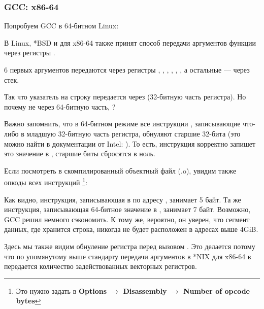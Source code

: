 \subsubsection{GCC: x86-64}

Попробуем GCC в 64-битном Linux:



В Linux, *BSD и \MacOSX для x86-64 также принят способ передачи аргументов функции через регистры \SysVABI.

6 первых аргументов передаются через регистры \RDI, \RSI, \RDX, \RCX, , , а остальные --- через стек.

Так что указатель на строку передается через \EDI (32-битную часть регистра).
Но почему не через 64-битную часть, \RDI?

Важно запомнить, что в 64-битном режиме все инструкции \MOV, записывающие что-либо в младшую 32-битную часть регистра, обнуляют старшие 32-бита (это можно найти в документации от Intel: ).
То есть, инструкция  корректно запишет это значение в \RAX, старшие биты сбросятся в ноль.

Если посмотреть в \IDA скомпилированный объектный файл (.o), увидим также опкоды всех инструкций
\footnote{Это нужно задать в \textbf{Options $\rightarrow$ Disassembly $\rightarrow$ Number of opcode bytes}}:



\label{hw_EDI_instead_of_RDI}
Как видно, инструкция, записывающая в \EDI по адресу , занимает 5 байт.
Та же инструкция, записывающая 64-битное значение в \RDI, занимает 7 байт.
Возможно, GCC решил немного сэкономить.
К тому же, вероятно, он уверен, что сегмент данных, где хранится строка, никогда не будет расположен в адресах выше 4\gls{GiB}.

\label{SysVABI_input_EAX}
Здесь мы также видим обнуление регистра \EAX перед вызовом \printf.
Это делается потому что по упомянутому выше стандарту передачи аргументов в *NIX для x86-64 в \EAX передается количество задействованных векторных регистров.

